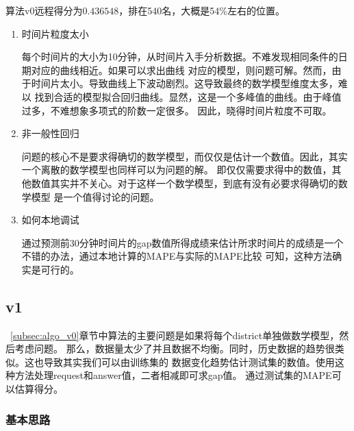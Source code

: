 \documentclass[hyperref,UTF8]{ctexart}
\theoremstyle{definition}
\theoremstyle{remark}
\numberwithin{equation}{subsection}
\begin{document}
	算法v0远程得分为$0.436548$，排在540名，大概是54\%左右的位置。
	\begin{enumerate}[(1)]
	
		\item 时间片粒度太小
		
		每个时间片的大小为10分钟，从时间片入手分析数据。不难发现相同条件的日期对应的曲线相近。如果可以求出曲线
		对应的模型，则问题可解。然而，由于时间片太小。导致曲线上下波动剧烈。这导致最终的数学模型维度太多，难以
		找到合适的模型拟合回归曲线。显然，这是一个多峰值的曲线。由于峰值过多，不难想象多项式的阶数一定很多。
		因此，晓得时间片粒度不可取。
		
		\item 非一般性回归
		
		问题的核心不是要求得确切的数学模型，而仅仅是估计一个数值。因此，其实一个离散的数学模型也同样可以为问题的解。
		即仅仅需要求得中的数值，其他数值其实并不关心。对于这样一个数学模型，到底有没有必要求得确切的数学模型
		是一个值得讨论的问题。
		
		\item 如何本地调试
		
		通过预测前30分钟时间片的gap数值所得成绩来估计所求时间片的成绩是一个不错的办法，通过本地计算的MAPE与实际的MAPE比较
		可知，这种方法确实是可行的。
		
	\end{enumerate}
	
\subsection{v1}
\label{subsec:algo_v1}

	~\ref{subsec:algo_v0}章节中算法的主要问题是如果将每个district单独做数学模型，然后考虑问题。
	那么，数据量太少了并且数据不均衡。同时，历史数据的趋势很类似。这也导致其实我们可以由训练集的
	数据变化趋势估计测试集的数值。使用这种方法处理request和answer值，二者相减即可求gap值。
	通过测试集的MAPE可以估算得分。
	
\subsubsection{基本思路}
\end{document}
